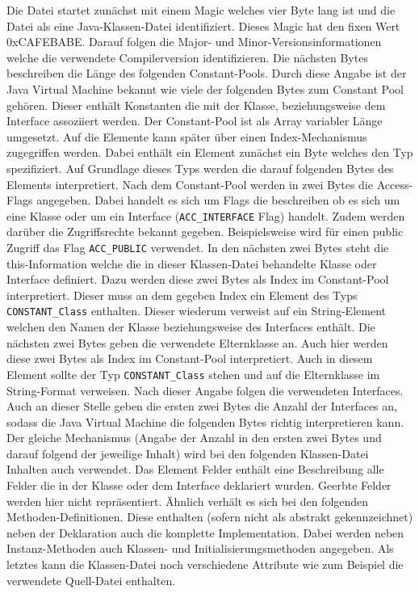 \documentclass[conference]{IEEEtran}
\begin{document}
Die Datei startet zunächst mit einem Magic welches vier Byte lang ist und die Datei als eine Java-Klassen-Datei identifiziert. Dieses Magic hat den fixen Wert 0xCAFEBABE. Darauf folgen die Major- und Minor-Versionsinformationen welche die verwendete Compilerversion identifizieren. Die nächsten Bytes beschreiben die Länge des folgenden Constant-Pools. Durch diese Angabe ist der Java Virtual Machine bekannt wie viele der folgenden Bytes zum Constant Pool gehören. Dieser enthält Konstanten die mit der Klasse, beziehungsweise dem Interface assoziiert werden. Der Constant-Pool ist als Array variabler Länge umgesetzt. Auf die Elemente kann später über einen Index-Mechanismus zugegriffen werden. Dabei enthält ein Element zunächst ein Byte welches den Typ spezifiziert. Auf Grundlage dieses Typs werden die darauf folgenden Bytes des Elements interpretiert. Nach dem Constant-Pool werden in zwei Bytes die Access-Flags angegeben. Dabei handelt es sich um Flags die beschreiben ob es sich um eine Klasse oder um ein Interface (\verb|ACC_INTERFACE| Flag) handelt. Zudem werden darüber die Zugriffsrechte bekannt gegeben. Beispielsweise wird für einen public Zugriff das Flag \verb|ACC_PUBLIC| verwendet. In den nächsten zwei Bytes steht die this-Information welche die in dieser Klassen-Datei behandelte Klasse oder Interface definiert. Dazu werden diese zwei Bytes als Index im Constant-Pool interpretiert. Dieser muss an dem gegeben Index ein Element des Typs \verb|CONSTANT_Class| enthalten. Dieser wiederum verweist auf ein String-Element welchen den Namen der Klasse beziehungsweise des Interfaces enthält. Die nächsten zwei Bytes geben die verwendete Elternklasse an. Auch hier werden diese zwei Bytes als Index im Constant-Pool interpretiert. Auch in diesem Element sollte der Typ \verb|CONSTANT_Class| stehen und auf die Elternklasse im String-Format verweisen. Nach dieser Angabe folgen die verwendeten Interfaces. Auch an dieser Stelle geben die ersten zwei Bytes die Anzahl der Interfaces an, sodass die Java Virtual Machine die folgenden Bytes richtig interpretieren kann. Der gleiche Mechanismus (Angabe der Anzahl in den ersten zwei Bytes und darauf folgend der jeweilige Inhalt) wird bei den folgenden Klassen-Datei Inhalten auch verwendet. Das Element Felder enthält eine Beschreibung alle Felder die in der Klasse oder dem Interface deklariert wurden. Geerbte Felder werden hier nicht repräsentiert. Ähnlich verhält es sich bei den folgenden Methoden-Definitionen. Diese enthalten (sofern nicht als abstrakt gekennzeichnet) neben der Deklaration auch die komplette Implementation. Dabei werden neben Instanz-Methoden auch Klassen- und Initialisierungsmethoden angegeben. Als letztes kann die Klassen-Datei noch verschiedene Attribute wie zum Beispiel die verwendete Quell-Datei enthalten. \cite{Venners.1996b} \cite{Lindholm.21.08.2018}
\end{document}
